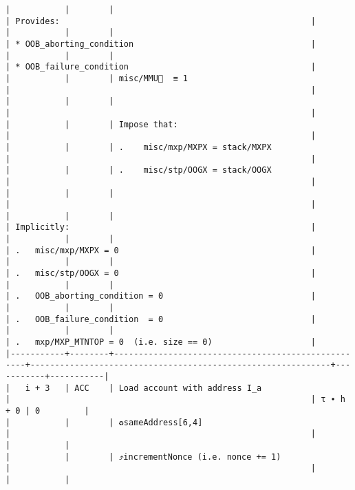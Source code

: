 \documentclass[varwidth=\maxdimen,margin=0.5cm,multi={verbatim}]{standalone}
\begin{document}
\begin{verbatim}
|           |        |                                                    | Provides:                                                   |
|           |        |                                                    | * OOB_aborting_condition                                    |
|           |        |                                                    | * OOB_failure_condition                                     |
|           |        | misc/MMU🚩  ≡ 1                                    |                                                             |
|           |        |                                                    |                                                             |
|           |        | Impose that:                                       |                                                             |
|           |        | .    misc/mxp/MXPX = stack/MXPX                    |                                                             |
|           |        | .    misc/stp/OOGX = stack/OOGX                    |                                                             |
|           |        |                                                    |                                                             |
|           |        |                                                    | Implicitly:                                                 |
|           |        |                                                    | .   misc/mxp/MXPX = 0                                       |
|           |        |                                                    | .   misc/stp/OOGX = 0                                       |
|           |        |                                                    | .   OOB_aborting_condition = 0                              |
|           |        |                                                    | .   OOB_failure_condition  = 0                              |
|           |        |                                                    | .   mxp/MXP_MTNTOP = 0  (i.e. size == 0)                    |
|-----------+--------+----------------------------------------------------+-------------------------------------------------------------+-----------+-----------|
|   i + 3   | ACC    | Load account with address I_a                      |                                                             | τ ∙ h + 0 | 0         |
|           |        | ♻️sameAddress[6,4]                                 |                                                             |           |           |
|           |        | ⤴️incrementNonce (i.e. nonce += 1)                 |                                                             |           |           |

\end{verbatim}
\end{document}
